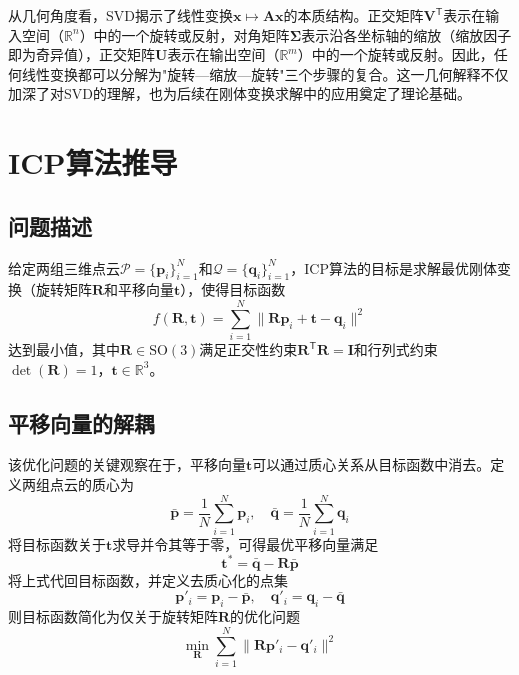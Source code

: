 \documentclass[a4paper,12pt]{ctexrep}
\begin{document}
从几何角度看，SVD揭示了线性变换$\bm{x}\mapsto\bm{A}\bm{x}$的本质结构。正交矩阵$\bm{V}^{\mathsf{T}}$表示在输入空间（$\mathbb{R}^n$）中的一个旋转或反射，对角矩阵$\bm{\Sigma}$表示沿各坐标轴的缩放（缩放因子即为奇异值），正交矩阵$\bm{U}$表示在输出空间（$\mathbb{R}^m$）中的一个旋转或反射。因此，任何线性变换都可以分解为"旋转—缩放—旋转"三个步骤的复合。这一几何解释不仅加深了对SVD的理解，也为后续在刚体变换求解中的应用奠定了理论基础。

\chapter{ICP算法推导}

\section{问题描述}

给定两组三维点云$\mathcal{P}=\{\bm{p}_i\}_{i=1}^{N}$和$\mathcal{Q}=\{\bm{q}_i\}_{i=1}^{N}$，ICP算法的目标是求解最优刚体变换（旋转矩阵$\bm{R}$和平移向量$\bm{t}$），使得目标函数
\begin{equation}
    f(\bm{R},\bm{t}) = \sum_{i=1}^{N}\|\bm{R}\bm{p}_i+\bm{t}-\bm{q}_i\|^2
\end{equation}
达到最小值，其中$\bm{R}\in\mathrm{SO}(3)$满足正交性约束$\bm{R}^{\mathsf{T}}\bm{R}=\bm{I}$和行列式约束$\det(\bm{R})=1$，$\bm{t}\in\mathbb{R}^3$。

\section{平移向量的解耦}

该优化问题的关键观察在于，平移向量$\bm{t}$可以通过质心关系从目标函数中消去。定义两组点云的质心为
\begin{equation}
    \bar{\bm{p}} = \frac{1}{N}\sum_{i=1}^{N}\bm{p}_i, \quad \bar{\bm{q}} = \frac{1}{N}\sum_{i=1}^{N}\bm{q}_i
\end{equation}
将目标函数关于$\bm{t}$求导并令其等于零，可得最优平移向量满足
\begin{equation}
    \bm{t}^* = \bar{\bm{q}} - \bm{R}\bar{\bm{p}}
\end{equation}
将上式代回目标函数，并定义去质心化的点集
\begin{equation}
    \bm{p}'_i = \bm{p}_i - \bar{\bm{p}}, \quad \bm{q}'_i = \bm{q}_i - \bar{\bm{q}}
\end{equation}
则目标函数简化为仅关于旋转矩阵$\bm{R}$的优化问题
\begin{equation}
    \min_{\bm{R}} \sum_{i=1}^{N}\|\bm{R}\bm{p}'_i - \bm{q}'_i\|^2
\end{equation}
\end{document}

